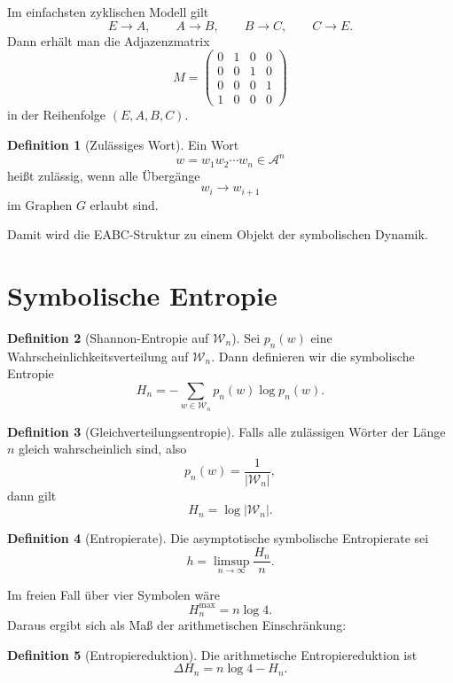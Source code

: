 \documentclass[11pt,a4paper]{article}
\theoremstyle{definition}
\newtheorem{definition}{Definition}[section]
\begin{document}
	Im einfachsten zyklischen Modell gilt
	\[
	E\to A,\qquad A\to B,\qquad B\to C,\qquad C\to E.
	\]
	Dann erhält man die Adjazenzmatrix
	\[
	M=
	\begin{pmatrix}
		0&1&0&0\\
		0&0&1&0\\
		0&0&0&1\\
		1&0&0&0
	\end{pmatrix}
	\]
	in der Reihenfolge \((E,A,B,C)\).
	
	\begin{definition}[Zulässiges Wort]
		Ein Wort
		\[
		w=w_1w_2\cdots w_n \in \mathcal A^n
		\]
		heißt zulässig, wenn alle Übergänge
		\[
		w_i \to w_{i+1}
		\]
		im Graphen \(G\) erlaubt sind.
	\end{definition}
	
	Damit wird die EABC-Struktur zu einem Objekt der symbolischen Dynamik.
	
	\section{Symbolische Entropie}
	
	\begin{definition}[Shannon-Entropie auf \(\mathcal W_n\)]
		Sei \(p_n(w)\) eine Wahrscheinlichkeitsverteilung auf \(\mathcal W_n\). Dann definieren wir die symbolische Entropie
		\[
		H_n=-\sum_{w\in\mathcal W_n} p_n(w)\log p_n(w).
		\]
	\end{definition}
	
	\begin{definition}[Gleichverteilungsentropie]
		Falls alle zulässigen Wörter der Länge \(n\) gleich wahrscheinlich sind, also
		\[
		p_n(w)=\frac{1}{|\mathcal W_n|},
		\]
		dann gilt
		\[
		H_n=\log |\mathcal W_n|.
		\]
	\end{definition}
	
	\begin{definition}[Entropierate]
		Die asymptotische symbolische Entropierate sei
		\[
		h=\limsup_{n\to\infty}\frac{H_n}{n}.
		\]
	\end{definition}
	
	Im freien Fall über vier Symbolen wäre
	\[
	H_n^{\max}=n\log 4.
	\]
	Daraus ergibt sich als Maß der arithmetischen Einschränkung:
	
	\begin{definition}[Entropiereduktion]
		Die arithmetische Entropiereduktion ist
		\[
		\Delta H_n = n\log 4 - H_n.
		\]
	\end{definition}
	
\end{document}
